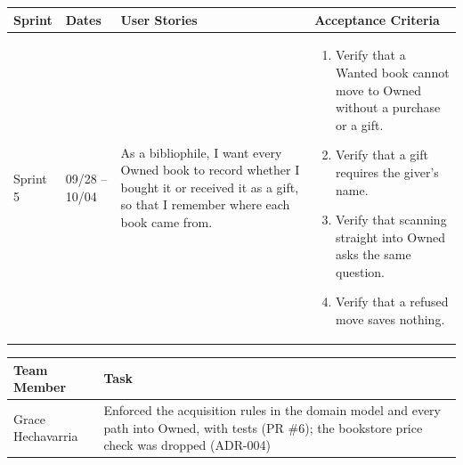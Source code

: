 \documentclass[12pt]{article}
\begin{document}
\vspace{1.5em}

\noindent\begin{minipage}{\linewidth}

\vspace{0.5em}
\noindent
\begin{tabular}{|L{1.2cm}|L{1.8cm}|L{5.2cm}|L{6.3cm}|}
\hline
\textbf{Sprint} & \textbf{Dates} & \textbf{User Stories} & \textbf{Acceptance Criteria} \\
\hline
Sprint 5 & 09/28 -- 10/04 &
As a bibliophile, I want every Owned book to record whether I bought it or received it as a gift, so that I remember where each book came from. &
\begin{enumerate}
    \item Verify that a Wanted book cannot move to Owned without a purchase or a gift.
    \item Verify that a gift requires the giver's name.
    \item Verify that scanning straight into Owned asks the same question.
    \item Verify that a refused move saves nothing.
\end{enumerate} \\
\hline
\end{tabular}

\vspace{0.5em}
\noindent
\begin{tabular}{|L{3.4cm}|L{11.6cm}|}
\hline
\textbf{Team Member} & \textbf{Task} \\
\hline
Grace Hechavarria & Enforced the acquisition rules in the domain model and every path into Owned, with tests (PR \#6); the bookstore price check was dropped (ADR-004) \\
\hline
\end{tabular}
\end{minipage}

\vspace{1.5em}
\end{document}
